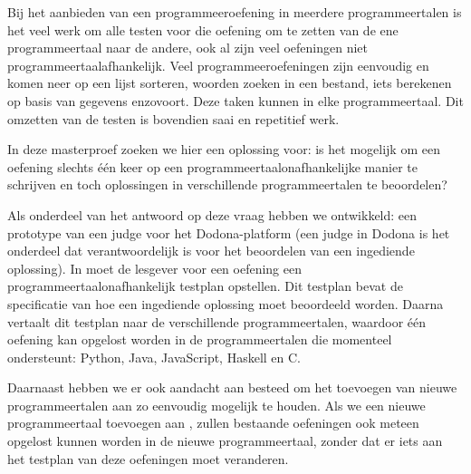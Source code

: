 Bij het aanbieden van een programmeeroefening in meerdere programmeertalen is het veel werk om alle testen voor die oefening om te zetten van de ene programmeertaal naar de andere, ook al zijn veel oefeningen niet programmeertaalafhankelijk.
Veel programmeeroefeningen zijn eenvoudig en komen neer op een lijst sorteren, woorden zoeken in een bestand, iets berekenen op basis van gegevens enzovoort.
Deze taken kunnen in elke programmeertaal.
Dit omzetten van de testen is bovendien saai en repetitief werk.

In deze masterproef zoeken we hier een oplossing voor: is het mogelijk om een oefening slechts één keer op een programmeertaalonafhankelijke manier te schrijven en toch oplossingen in verschillende programmeertalen te beoordelen?

Als onderdeel van het antwoord op deze vraag hebben we \tested{} ontwikkeld: een prototype van een judge voor het Dodona-platform (een judge in Dodona is het onderdeel dat verantwoordelijk is voor het beoordelen van een ingediende oplossing).
In \tested{} moet de lesgever voor een oefening een programmeertaalonafhankelijk testplan opstellen.
Dit testplan bevat de specificatie van hoe een ingediende oplossing moet beoordeeld worden.
Daarna vertaalt \tested{} dit testplan naar de verschillende programmeertalen, waardoor één oefening kan opgelost worden in de programmeertalen die \tested{} momenteel ondersteunt: Python, Java, JavaScript, Haskell en C.\@

Daarnaast hebben we er ook aandacht aan besteed om het toevoegen van nieuwe programmeertalen aan \tested{} zo eenvoudig mogelijk te houden.
Als we een nieuwe programmeertaal toevoegen aan \tested{}, zullen bestaande oefeningen ook meteen opgelost kunnen worden in de nieuwe programmeertaal, zonder dat er iets aan het testplan van deze oefeningen moet veranderen.